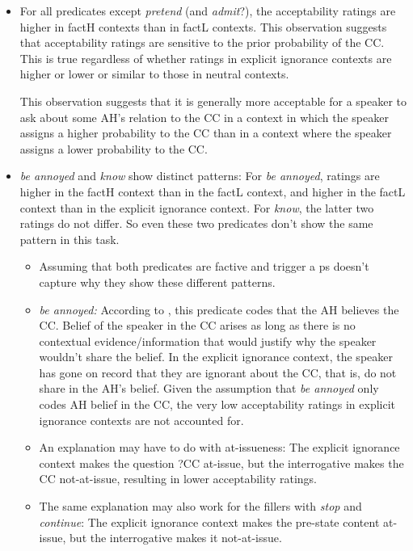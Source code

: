 \documentclass[11pt,fleqn]{article}
\newcommand{\6}{\mbox{$[\hspace*{-.6mm}[$}}
\newcommand{\9}{\mbox{$]\hspace*{-.6mm}]$}}
\begin{document}
\begin{itemize}

\item For all predicates except {\em pretend} (and {\em admit}?), the acceptability ratings are higher in factH contexts than in factL contexts. This observation suggests that acceptability ratings are sensitive to the prior probability of the CC. This is true regardless of whether ratings in explicit ignorance contexts are higher or lower or similar to those in neutral contexts.

This observation suggests that it is generally more acceptable for a speaker to ask about some AH's relation to the CC in a context in which the speaker assigns a higher probability to the CC than in a context where the speaker assigns a lower probability to the CC.

\item {\em be annoyed} and {\em know} show distinct patterns: For {\em be annoyed}, ratings are higher in the factH context than in the factL context, and higher in the factL context than in the explicit ignorance context. For {\em know}, the latter two ratings do not differ. So even these two predicates don't show the same pattern in this task. 

\begin{itemize}

\item Assuming that both predicates are factive and trigger a ps doesn't capture why they show these different patterns.

\item {\em be annoyed:} According to \citealt{karttunen2016}, this predicate codes that the AH believes the CC. Belief of the speaker in the CC arises as long as there is no contextual evidence/information that would justify why the speaker wouldn't share the belief. In the explicit ignorance context, the speaker has gone on record that they are ignorant about the CC, that is, do not share in the AH's belief. Given the assumption that {\em be annoyed} only codes AH belief in the CC, the very low acceptability ratings in explicit ignorance contexts are not accounted for. 

\item An explanation may have to do with at-issueness: The explicit ignorance context makes the question ?CC at-issue, but  the interrogative makes the CC not-at-issue, resulting in lower acceptability ratings. 

\item The same explanation may also work for the fillers with {\em stop} and {\em continue}: The explicit ignorance context makes the pre-state content at-issue, but the interrogative makes it not-at-issue.


\end{itemize}
\end{itemize}
\end{document}
